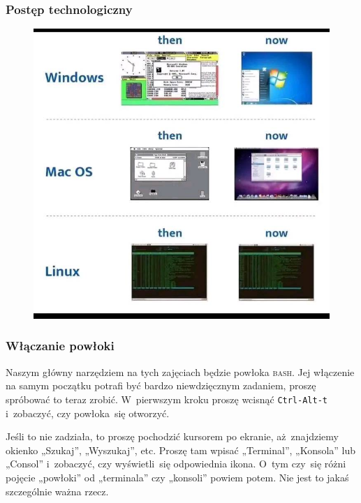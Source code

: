 \documentclass[10pt,t]{beamer}
\begin{document}
\begin{frame}
  \frametitle{Postęp technologiczny}

  \vspace{-0.5em}


  \begin{figure}

    \label{fig:Evolution-of-OS}

    \centering


    \includegraphics[scale=0.3]
    {./Presentations-pictures/Miscancellous-pictures/Evolution-of-operating-systems.jpg}

  \end{figure}

\end{frame}





\begin{frame}
  \frametitle{Włączanie powłoki}


  Naszym główny narzędziem na tych zajęciach będzie powłoka \textsc{bash}.
  Jej włączenie na samym początku potrafi być bardzo niewdzięcznym zadaniem,
  proszę spróbować to teraz zrobić. W~pierwszym kroku proszę wcisnąć
  \texttt{Ctrl-Alt-t} i~zobaczyć, czy powłoka~się otworzyć.

  Jeśli to nie zadziała, to proszę pochodzić kursorem po ekranie,
  aż~znajdziemy okienko „Szukaj”, „Wyszukaj”, etc. Proszę tam wpisać
  „Terminal”, „Konsola” lub „Consol” i~zobaczyć, czy wyświetli~się
  odpowiednia ikona. O~tym czy~się różni pojęcie „powłoki” od „terminala”
  czy „konsoli” powiem potem. Nie jest to jakaś szczególnie ważna rzecz.

\end{frame}
\end{document}
